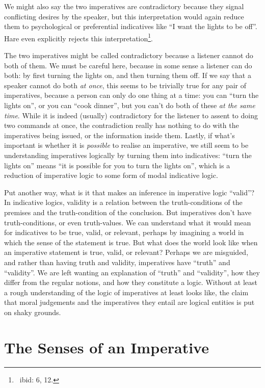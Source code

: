 \documentclass[12pt]{article}
\begin{document}
We might also say the two imperatives are contradictory because they signal conflicting desires by the speaker, but this interpretation would again reduce them to psychological or preferential indicatives like ``I want the lights to be off''. Hare even explicitly rejects this interpretation\footnote{~ibid: 6, 12.}.

The two imperatives might be called contradictory because a listener cannot do both of them. We must be careful here, because in some sense a listener can do both: by first turning the lights on, and then turning them off. If we say that a speaker cannot do both \textit{at once}, this seems to be trivially true for any pair of imperatives, because a person can only do one thing at a time: you can ``turn the lights on'', or you can ``cook dinner'', but you can't do both of these \textit{at the same time}. While it is indeed (usually) contradictory for the listener to assent to doing two commands at once, the contradiction really has nothing to do with the imperatives being issued, or the information inside them. Lastly, if what's important is whether it is \textit{possible} to realise an imperative, we still seem to be understanding imperatives logically by turning them into indicatives: ``turn the lights on'' means ``it is possible for you to turn the lights on'', which is a reduction of imperative logic to some form of modal indicative logic.

Put another way, what is it that makes an inference in imperative logic ``valid''? In indicative logics, validity is a relation between the truth-conditions of the premises and the truth-condition of the conclusion. But imperatives don't have truth-conditions, or even truth-values. We can understand what it would mean for indicatives to be true, valid, or relevant, perhaps by imagining a world in which the sense of the statement is true. But what does the world look like when an imperative statement is true, valid, or relevant? Perhaps we are misguided, and rather than having truth and validity, imperatives have ``truth'' and ``validity''. We are left wanting an explanation of ``truth'' and ``validity'', how they differ from the regular notions, and how they constitute a logic. Without at least a rough understanding of the logic of imperatives at least looks like, the claim that moral judgements and the imperatives they entail are logical entities is put on shaky grounds.

\section{The Senses of an Imperative}
\end{document}
